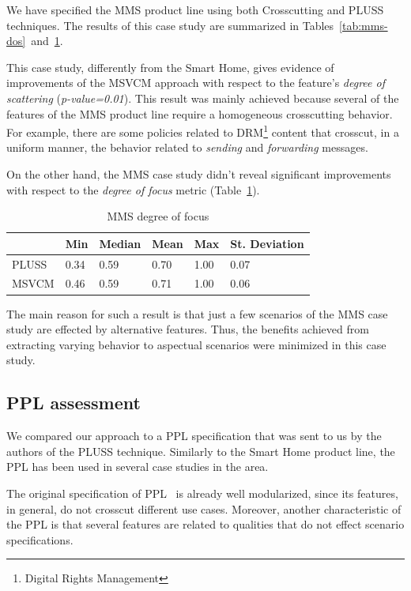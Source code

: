 \documentclass{sig-alt-full}
\begin{document}
We have specified the MMS product line using both Crosscutting and PLUSS
techniques. The results of this case study are
summarized in Tables~\ref{tab:mms-dos}~and~\ref{tab:mms-dof}.

This case study, differently from the Smart Home, gives evidence of improvements of the
MSVCM approach with respect to the feature's \emph{degree of scattering}
(\emph{p-value=0.01}). This result was mainly achieved because several of the features of
the MMS product line require a homogeneous crosscutting behavior. For example,
there are some policies related to DRM\footnote{Digital Rights Management}
content that crosscut, in a uniform manner, the behavior related to
\emph{sending} and \emph{forwarding} messages.

On the other hand, the MMS case study didn't reveal significant improvements with
respect to the \emph{degree of focus} metric (Table~\ref{tab:mms-dof}). 

\begin{table}[htb] \centering
\caption{MMS degree of focus}
\label{tab:mms-dof}
\begin{small}
\begin{tabular}{llllll} \hline
					& Min 	& Median 	& Mean 	& Max 	& St. Deviation \\ \hline 
	PLUSS			& 0.34	& 0.59		& 0.70	& 1.00	& 0.07			\\
	MSVCM			& 0.46  & 0.59   	& 0.71 	& 1.00 	& 0.06			\\ \hline	
\end{tabular}
\end{small}
\end{table}

The main reason for such a result is that just a few scenarios of the MMS case study are effected by alternative
features. Thus, the benefits achieved from extracting varying behavior to
aspectual scenarios were minimized in this case study.



\subsection{PPL assessment}

We compared our approach to a PPL specification that was sent to us by the
authors of the PLUSS technique. Similarly to the Smart Home product line, the PPL has been used in several case
studies in the area. 

The original specification of PPL~\cite{PPL:2008} is already well
modularized, since its features, in general, do not crosscut different
use cases. Moreover, another characteristic of the PPL is that several features
are related to qualities that do not effect scenario specifications.
\end{document}
